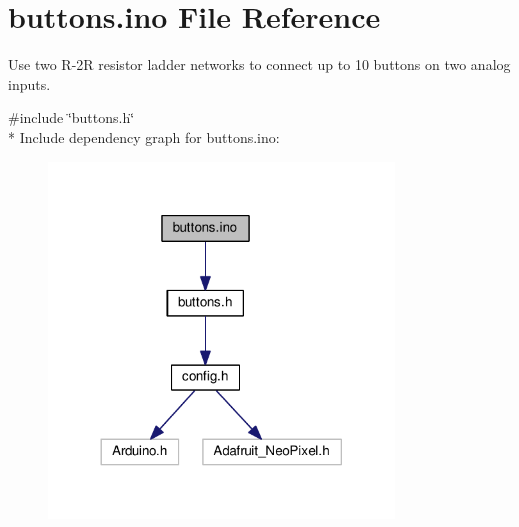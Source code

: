 \hypertarget{buttons_8ino}{}\section{buttons.\+ino File Reference}
\label{buttons_8ino}


Use two R-\/2R resistor ladder networks to connect up to 10 buttons on two analog inputs.  


{\ttfamily \#include \char`\"{}buttons.\+h\char`\"{}}\\*
Include dependency graph for buttons.\+ino\+:\nopagebreak
\begin{figure}[H]
\begin{center}
\leavevmode
\includegraphics[width=260pt]{buttons_8ino__incl}
\end{center}
\end{figure}
